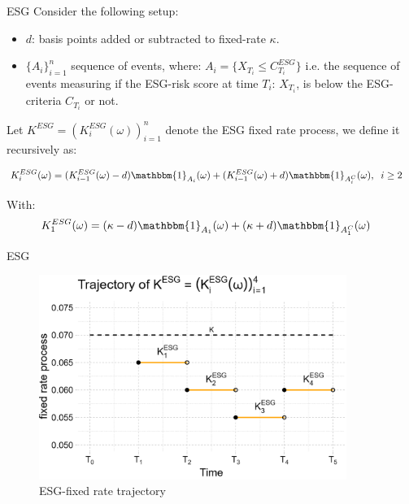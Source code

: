 \documentclass[UKenglish]{beamer}
\begin{document}
\begin{frame}{ESG}
Consider the following setup: 
\begin{itemize}
    \item $d$: basis points added or subtracted to fixed-rate $\kappa$. 
    \item $\{A_{i}\}_{i=1}^{n}$ sequence of events, where: 
    $A_{i} = \{X_{T_{i}} \leq C_{T_{i}}^{ESG}\}$
    i.e. the sequence of events measuring if the ESG-risk score at time $T_{i}$: $X_{T_{i}}$, is below the ESG-criteria $C_{T_{i}}$ or not. 
\end{itemize}

\begin{definition}
Let $K^{ESG} = (K_{i}^{ESG}(\omega))_{i=1}^{n}$ 
denote the ESG fixed rate process, we define it recursively as: 

\begin{align*}
K_{i}^{ESG}(\omega) &= (K_{i-1}^{ESG}(\omega)-d)\mathbbm{1}_{A_{i}}(\omega)
+ (K_{i-1}^{ESG}(\omega)+d)\mathbbm{1}_{A_{i}^{C}}(\omega), \;\; i\geq 2
\end{align*}

With:
\begin{align*}
K_{1}^{ESG}(\omega) &= (\kappa - d)\mathbbm{1}_{A_{1}}(\omega)
+ (\kappa + d)\mathbbm{1}_{A_{1}^{C}}(\omega)    
\end{align*}
\end{definition}

\end{frame}


\begin{frame}{ESG}
\begin{figure}[htp]
    \centering
    \includegraphics[width=10cm]{ESG/SBM_ESG_path.png}
    \caption{ESG-fixed rate trajectory}
    \label{fig: SBM_ESG_path}
\end{figure}
\end{frame}
\end{document}
